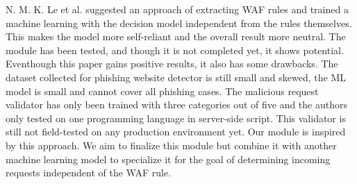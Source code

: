 N. M. K. Le et al. \cite{Khoi} suggested an approach of extracting WAF rules and trained a machine learning with the decision model independent from the rules themselves. This makes the model more self-reliant and the overall result more neutral. The module has been tested, and though it is not completed yet, it shows potential. Eventhough this paper gains positive results, it also has some drawbacks. The dataset collected for phishing website detector is still small and skewed, the ML model is small and cannot cover all phishing cases. The malicious request validator has only been trained with three categories out of five and the authors only tested on one programming language in server-side script. This validator is still not field-tested on any production environment yet. Our module is inspired by this approach. We aim to finalize this module but combine it with another machine learning model to specialize it for the goal of determining incoming requests independent of the WAF rule.

